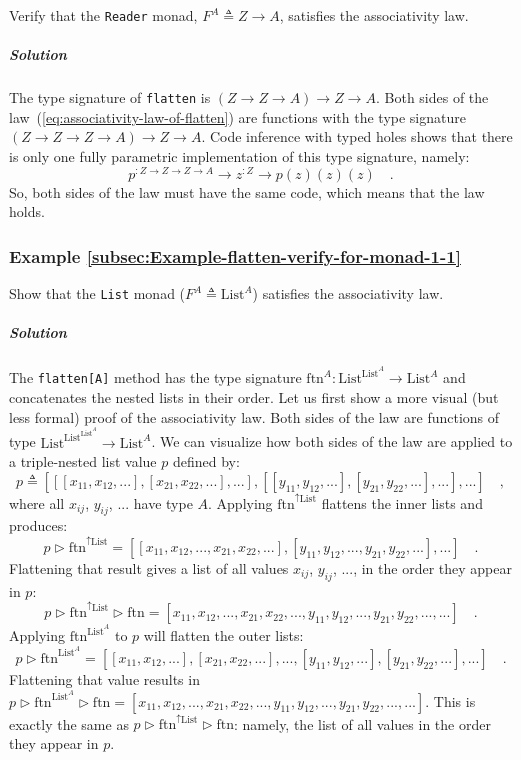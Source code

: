 Verify that the \lstinline!Reader! monad, $F^{A}\triangleq Z\rightarrow A$,
satisfies the associativity law.

\subparagraph{Solution}

The type signature of \lstinline!flatten! is $\left(Z\rightarrow Z\rightarrow A\right)\rightarrow Z\rightarrow A$.
Both sides of the law~(\ref{eq:associativity-law-of-flatten}) are
functions with the type signature $(Z\rightarrow Z\rightarrow Z\rightarrow A)\rightarrow Z\rightarrow A$.
Code inference with typed holes shows that there is only one fully
parametric implementation of this type signature, namely:
\[
p^{:Z\rightarrow Z\rightarrow Z\rightarrow A}\rightarrow z^{:Z}\rightarrow p(z)(z)(z)\quad.
\]
So, both sides of the law must have the same code, which means that
the law holds.

\subsubsection{Example \label{subsec:Example-flatten-verify-for-monad-1-1}\ref{subsec:Example-flatten-verify-for-monad-1-1}}

Show that the \lstinline!List! monad
($F^{A}\triangleq\text{List}^{A}$) satisfies the associativity law.

\subparagraph{Solution}

The \lstinline!flatten[A]! method has the type signature $\text{ftn}^{A}:\text{List}^{\text{List}^{A}}\rightarrow\text{List}^{A}$
and concatenates the nested lists in their order. Let us first show
a more visual (but less formal) proof of the associativity law. Both
sides of the law are functions of type $\text{List}^{\text{List}^{\text{List}^{A}}}\rightarrow\text{List}^{A}$.
We can visualize how both sides of the law are applied to a triple-nested
list value $p$ defined by:
\[
p\triangleq\left[\left[\left[x_{11},x_{12},...\right],\left[x_{21},x_{22},...\right],...\right],\left[\left[y_{11},y_{12},...\right],\left[y_{21},y_{22},...\right],...\right],...\right]\quad,
\]
where all $x_{ij}$, $y_{ij}$, $...$ have type $A$. Applying $\text{ftn}^{\uparrow\text{List}}$
flattens the inner lists and produces:
\[
p\triangleright\text{ftn}^{\uparrow\text{List}}=\left[\left[x_{11},x_{12},...,x_{21},x_{22},...\right],\left[y_{11},y_{12},...,y_{21},y_{22},...\right],...\right]\quad.
\]
Flattening that result gives a list of all values $x_{ij}$, $y_{ij}$,
..., in the order they appear in $p$:
\[
p\triangleright\text{ftn}^{\uparrow\text{List}}\triangleright\text{ftn}=\left[x_{11},x_{12},...,x_{21},x_{22},...,y_{11},y_{12},...,y_{21},y_{22},...,...\right]\quad.
\]
Applying $\text{ftn}^{\text{List}^{A}}$ to $p$ will flatten the
outer lists:
\[
p\triangleright\text{ftn}^{\text{List}^{A}}=\left[\left[x_{11},x_{12},...\right],\left[x_{21},x_{22},...\right],...,\left[y_{11},y_{12},...\right],\left[y_{21},y_{22},...\right],...\right]\quad.
\]
Flattening that value results in $p\triangleright\text{ftn}^{\text{List}^{A}}\triangleright\text{ftn}=\left[x_{11},x_{12},...,x_{21},x_{22},...,y_{11},y_{12},...,y_{21},y_{22},...,...\right]$.
This is exactly the same as $p\triangleright\text{ftn}^{\uparrow\text{List}}\triangleright\text{ftn}$:
namely, the list of all values in the order they appear in $p$.

